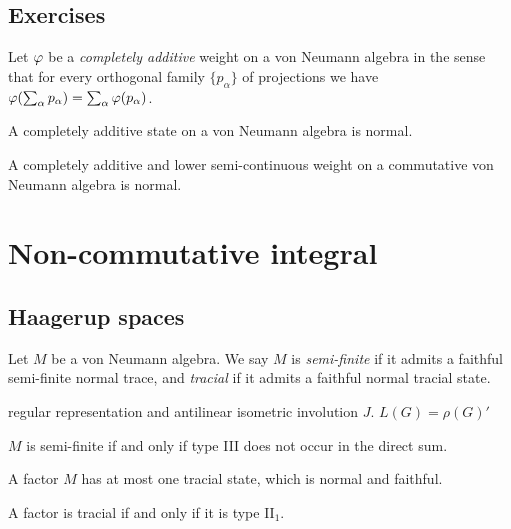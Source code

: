 \documentclass{../../large}
\begin{document}
\section*{Exercises}

\begin{prb}
Let $\varphi$ be a \emph{completely additive} weight on a von Neumann algebra in the sense that for every orthogonal family $\{p_\alpha\}$ of projections we have $\varphi(\sum_\alpha p_\alpha)=\sum_\alpha\varphi(p_\alpha)$.
\begin{parts}
\item A completely additive state on a von Neumann algebra is normal.
\item A completely additive and lower semi-continuous weight on a commutative von Neumann algebra is normal.
\end{parts}
\end{prb}











\chapter{Non-commutative integral}



\section{Haagerup spaces}

\begin{prb}
Let $M$ be a von Neumann algebra.
We say $M$ is \emph{semi-finite} if it admits a faithful semi-finite normal trace, and \emph{tracial} if it admits a faithful normal tracial state.
\begin{parts}
\item regular representation and antilinear isometric involution $J$. $L(G)=\rho(G)'$
\item $M$ is semi-finite if and only if type III does not occur in the direct sum.

\item A factor $M$ has at most one tracial state, which is normal and faithful.
\item A factor is tracial if and only if it is type II$_1$.
\end{parts}
\end{prb}
\end{document}
